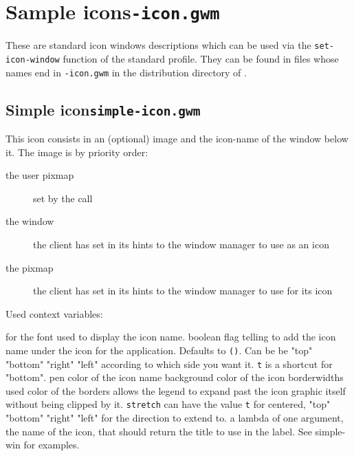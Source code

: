 \section{Sample icons\hfill{\tt *-icon.gwm}}
\label{standard-icons}

These are standard icon windows descriptions which can be used via the
\verb"set-icon-window" function of the standard profile. They can be found in
files whose names end in {\tt -icon.gwm} in the distribution directory of
{\GWM}.

\subsection{Simple icon\hfill{\tt simple-icon.gwm}}
\label{simple-icon}

This icon consists in an (optional) image and the icon-name of the
window below it. The image is by priority order:

\begin{description}
\item[the user pixmap] set by the  call
\item[the window] the client has set in its hints to the window manager to
use as an icon
\item[the pixmap] the client has set in its hints to the window manager to
use for its icon
\end{description}

Used context variables:

\begin{description}
 for the font used to display the icon name.
 boolean flag telling to add the icon name under
the icon for the application. Defaults to \verb"()". Can be be "top" "bottom"
"right" "left" according to which side you want it. \verb|t| is a shortcut for
"bottom".
 pen color of the icon name
 background color of the icon
 borderwidths used
 color of the borders
 allows the legend to expand past the icon graphic itself
without being clipped by it. \verb|stretch| can have the value \verb|t| for
centered, "top" "bottom" "right" "left" for the direction to extend to.
a lambda of one argument, the name of the icon, that should return the
title to use in the label. See simple-win for examples.
\end{description}

